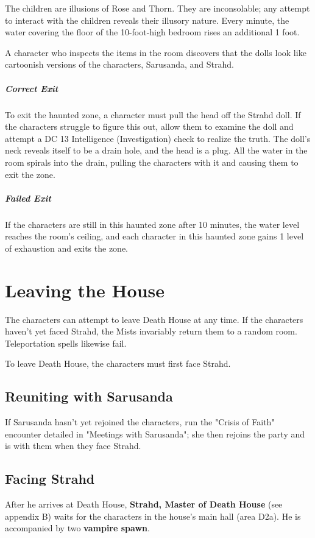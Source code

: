 \documentclass[10pt,a4paper,twoside,bg=print,twocolumn,openany,nodeprecatedcode]{dndbook}
\begin{document}
The children are illusions of Rose and Thorn. They are inconsolable; any attempt to interact with the children reveals their illusory nature. Every minute, the water covering the floor of the 10-foot-high bedroom rises an additional 1 foot.

A character who inspects the items in the room discovers that the dolls look like cartoonish versions of the characters, Sarusanda, and Strahd.

\subparagraph{Correct Exit}
To exit the haunted zone, a character must pull the head off the Strahd doll. If the characters struggle to figure this out, allow them to examine the doll and attempt a DC 13 Intelligence (Investigation) check to realize the truth. The doll's neck reveals itself to be a drain hole, and the head is a plug. All the water in the room spirals into the drain, pulling the characters with it and causing them to exit the zone.

\subparagraph{Failed Exit}
If the characters are still in this haunted zone after 10 minutes, the water level reaches the room's ceiling, and each character in this haunted zone gains 1 level of exhaustion and exits the zone.

\section{Leaving the House}
The characters can attempt to leave Death House at any time. If the characters haven't yet faced Strahd, the Mists invariably return them to a random room. Teleportation spells likewise fail.

To leave Death House, the characters must first face Strahd.

\subsection{Reuniting with Sarusanda}
If Sarusanda hasn't yet rejoined the characters, run the "Crisis of Faith" encounter detailed in "Meetings with Sarusanda"; she then rejoins the party and is with them when they face Strahd.

\subsection{Facing Strahd}
After he arrives at Death House, \textbf{Strahd, Master of Death House} (see appendix B) waits for the characters in the house's main hall (area D2a). He is accompanied by two \textbf{vampire spawn}.
\end{document}
